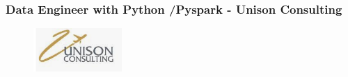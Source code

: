 \documentclass[12pt]{article}
\begin{document}
\begin{enumerate}
                \end{enumerate}




            \subsubsection{Data Engineer with Python /Pyspark - Unison Consulting}

                \begin{figure}[!h]
                    \centering
                    \includegraphics[width=0.3\textwidth]{Recursos/Img/UnisonConsultingLogo.png}
                \end{figure}
\end{document}
